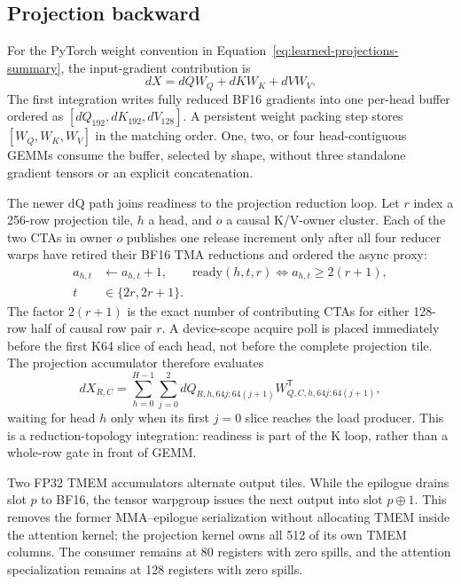 \subsection{Projection backward}

For the PyTorch weight convention in Equation~\ref{eq:learned-projections-summary},
the input-gradient contribution is
\begin{equation}
  dX=dQW_Q+dKW_K+dVW_V.
  \label{eq:projection-dgrad}
\end{equation}
The first integration writes fully reduced BF16 gradients into one per-head
buffer ordered as $[dQ_{192},dK_{192},dV_{128}]$.  A persistent weight packing
step stores $[W_Q,W_K,W_V]$ in the matching order.  One, two, or four
head-contiguous GEMMs consume the buffer, selected by shape, without three
standalone gradient tensors or an explicit concatenation.

The newer dQ path joins readiness to the projection reduction loop.  Let
$r$ index a 256-row projection tile, $h$ a head, and $o$ a causal K/V-owner
cluster.  Each of the two CTAs in owner $o$ publishes one release increment
only after all four reducer warps have retired their BF16 TMA reductions and
ordered the async proxy:
\begin{align}
  a_{h,t} &\leftarrow a_{h,t}+1,\qquad
  \mathrm{ready}(h,t,r)\iff a_{h,t}\ge 2(r+1),\\
  t&\in\{2r,2r+1\}.
  \label{eq:dq-head-arrival}
\end{align}
The factor $2(r+1)$ is the exact number of contributing CTAs for either
128-row half of causal row pair $r$.  A device-scope acquire poll is placed
immediately before the first K64 slice of each head, not before the complete
projection tile.  The projection accumulator therefore evaluates
\begin{equation}
  dX_{R,C}=\sum_{h=0}^{H-1}\sum_{j=0}^{2}
    dQ_{R,h,64j:64(j+1)}
    W_{Q,C,h,64j:64(j+1)}^{\mathsf T},
  \label{eq:head-pipelined-dq-projection}
\end{equation}
waiting for head $h$ only when its first $j=0$ slice reaches the load
producer.  This is a reduction-topology integration: readiness is part of the
K loop, rather than a whole-row gate in front of GEMM.

Two FP32 TMEM accumulators alternate output tiles.  While the epilogue drains
slot $p$ to BF16, the tensor warpgroup issues the next output into slot
$p\oplus1$.  This removes the former MMA--epilogue serialization without
allocating TMEM inside the attention kernel; the projection kernel owns all
512 of its own TMEM columns.  The consumer remains at 80 registers with zero
spills, and the attention specialization remains at 128 registers with zero
spills.

